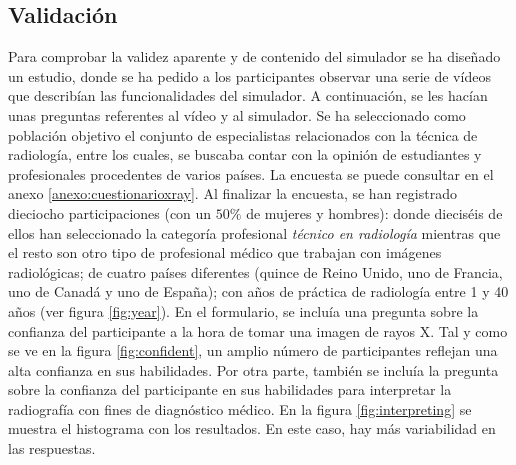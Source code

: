 \subsection{Validación}
\label{xray:validacion}
Para comprobar la validez aparente y de contenido del simulador se ha diseñado un estudio, donde se ha pedido a los participantes observar una serie de vídeos que describían las funcionalidades del simulador. A continuación, se les hacían unas preguntas referentes al vídeo y al simulador. Se ha seleccionado como población objetivo el conjunto de especialistas relacionados con la técnica de radiología, entre los cuales, se buscaba contar con la opinión de estudiantes y profesionales procedentes de varios países. La encuesta se puede consultar en el anexo \ref{anexo:cuestionarioxray}.
%
Al finalizar la encuesta, se han registrado dieciocho participaciones (con un $50\%$ de mujeres y hombres): donde dieciséis de ellos han seleccionado la categoría profesional \emph{técnico en radiología} mientras que el resto son otro tipo de profesional médico que trabajan con imágenes radiológicas; de cuatro países diferentes (quince de Reino Unido, uno de Francia, uno de Canadá y uno de España); con años de práctica de radiología entre 1 y 40 años (ver figura \ref{fig:year}).
%
En el formulario, se incluía una pregunta sobre la confianza del participante a la hora de tomar una imagen de rayos X. Tal y como se ve en la figura \ref{fig:confident}, un amplio número de participantes reflejan una alta confianza en sus habilidades.
%
Por otra parte, también se incluía la pregunta sobre la confianza del participante en sus habilidades para interpretar la radiografía con fines de diagnóstico médico. En la figura \ref{fig:interpreting} se muestra el histograma con los resultados. En este caso, hay más variabilidad en las respuestas.


